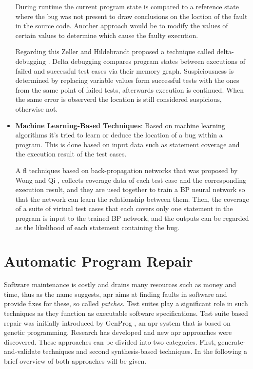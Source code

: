 \documentclass[
fancyheadings, %
%
%
]{stsreprt}
\begin{document}
\begin{itemize}
    During runtime the current program state is compared to a reference state where the bug was not present to draw conclusions on the loction of the fault in the source code. 
    Another approach would be to modify the values of certain values to determine which cause the faulty execution. \par
    Regarding this Zeller and Hildebrandt proposed a technique called delta-debugging \cite{delta-debugging:2002}. Delta debugging compares program states between executions of failed and successful test cases via their memory graph. 
    Suspiciousness is determined by replacing variable values form successful tests with the ones from the same point of failed tests, afterwards execution is continued. 
    When the same error is observerd the location is still considered suspicious, otherwise not. 
    \item \textbf{Machine Learning-Based Techniques}: Based on machine learning algorithms it's tried to learn or deduce the location of a bug within a program.
    This is done based on input data such as statement coverage and the execution result of the test cases. \par
    A \acrshort{fl} techniques based on back-propagation networks that was proposed by Wong and Qi \cite{bp-fl:2009}, collects coverage data of each test case and the corresponding execution result, and they are used together to train a BP neural network so that the network can learn the relationship between them. 
    Then, the coverage of a suite of virtual test cases that each covers only one statement in the program is input to the trained BP network, and the outputs can be regarded as the likelihood of each statement containing the bug.
\end{itemize}
\section{Automatic Program Repair}
Software maintenance is costly and drains many resources such as money and time, thus as the name suggests, \acrshort{apr} aims at finding faults in software and provide fixes for these, so called \textit{patches}. 
Test suites play a significant role in such techniques as they function as executable software specifications. 
Test suite based repair was initially introduced by GenProg \cite{genprog:2012}, an \acrshort{apr} system that is based on genetic programming.
Research has developed and new \acrshort{apr} approaches were discovered. These approaches can be divided into two categories.
First, generate-and-validate techniques and second synthesis-based techniques. 
In the following a brief overview of both approaches will be given.
\end{document}
